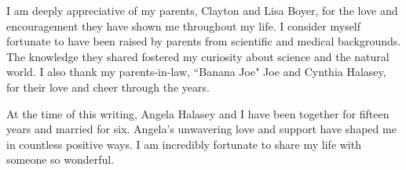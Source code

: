 I am deeply appreciative of my parents, Clayton and Lisa Boyer, for the love and encouragement they have shown me throughout my life. I consider myself fortunate to have been raised by parents from scientific and medical backgrounds. The knowledge they shared fostered my curiosity about science and the natural world. I also thank my parents-in-law, ``Banana Joe" Joe and Cynthia Halasey, for their love and cheer through the years.

At the time of this writing, Angela Halasey and I have been together for fifteen years and married for six. Angela's unwavering love and support have shaped me in countless positive ways. I am incredibly fortunate to share my life with someone so wonderful.
